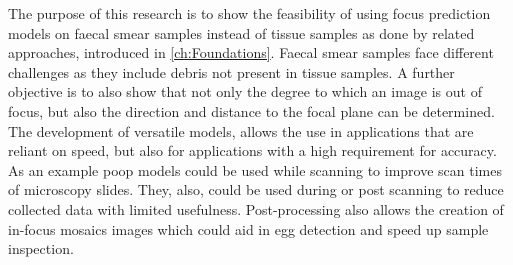 The purpose of this research is to show the feasibility of using focus prediction models on faecal smear samples instead of tissue samples as done by related approaches, introduced in \autoref{ch:Foundations}. Faecal smear samples face different challenges as they include debris not present in tissue samples.
A further objective is to also show that not only the degree to which an image is out of focus, but also the direction and distance to the focal plane can be determined. The development of versatile models, allows the use in applications that are reliant on speed, but also for applications with a high requirement for accuracy. As an example \ac{poop} models could be used while scanning to improve scan times of microscopy slides. They, also, could be used during or post scanning to reduce collected data with limited usefulness. Post-processing also allows the creation of in-focus mosaics images which could aid in egg detection and speed up sample inspection.
